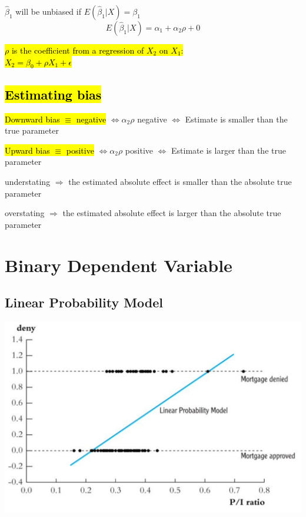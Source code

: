 \documentclass[a3paper, 8pt]{extarticle}
\begin{document}
\begin{multicols*}{5}
$\hat{\beta}_1$ will be unbiased if $E(\hat{\beta}_1 | X) = \beta_1$
$$E(\hat{\beta}_1 | X) = \alpha_1 + \alpha_2 \rho + 0$$

\hl{$\rho$ is the coefficient from a regression of $X_2$ on $X_1$: \\ $X_2 = \beta_0 + \rho X_1 + \epsilon$}

\subsection{\hl{Estimating bias}}


\hl{Downward bias $\equiv$ negative }  $ \Leftrightarrow \alpha_2 \rho$ negative $\Leftrightarrow$  Estimate is smaller than the true parameter


\hl{Upward bias $\equiv$ positive}  $ \Leftrightarrow \alpha_2 \rho$ positive $\Leftrightarrow$  Estimate is larger than the true parameter

understating $\Rightarrow$ the estimated absolute effect is smaller than the absolute true parameter

overstating $\Rightarrow$ the estimated absolute effect is larger than the absolute true parameter

\section{Binary Dependent Variable}
\subsection{Linear Probability Model}

\includegraphics[width =  \columnwidth]{Screen Shot 2023-03-12 at 15.30.59.png}


\end{multicols*}
\end{document}
